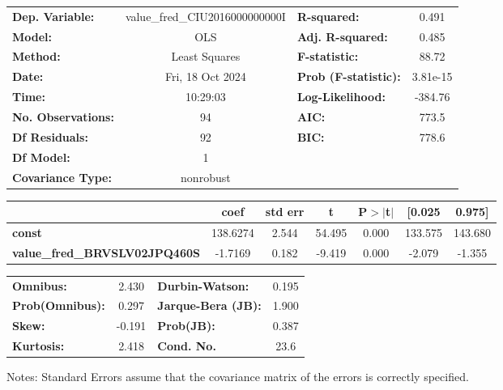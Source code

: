 \begin{center}
\begin{tabular}{lclc}
\toprule
\textbf{Dep. Variable:}               & value\_fred\_CIU2016000000000I & \textbf{  R-squared:         } &     0.491   \\
\textbf{Model:}                       &              OLS               & \textbf{  Adj. R-squared:    } &     0.485   \\
\textbf{Method:}                      &         Least Squares          & \textbf{  F-statistic:       } &     88.72   \\
\textbf{Date:}                        &        Fri, 18 Oct 2024        & \textbf{  Prob (F-statistic):} &  3.81e-15   \\
\textbf{Time:}                        &            10:29:03            & \textbf{  Log-Likelihood:    } &   -384.76   \\
\textbf{No. Observations:}            &                 94             & \textbf{  AIC:               } &     773.5   \\
\textbf{Df Residuals:}                &                 92             & \textbf{  BIC:               } &     778.6   \\
\textbf{Df Model:}                    &                  1             & \textbf{                     } &             \\
\textbf{Covariance Type:}             &           nonrobust            & \textbf{                     } &             \\
\bottomrule
\end{tabular}
\begin{tabular}{lcccccc}
                                      & \textbf{coef} & \textbf{std err} & \textbf{t} & \textbf{P$> |$t$|$} & \textbf{[0.025} & \textbf{0.975]}  \\
\midrule
\textbf{const}                        &     138.6274  &        2.544     &    54.495  &         0.000        &      133.575    &      143.680     \\
\textbf{value\_fred\_BRVSLV02JPQ460S} &      -1.7169  &        0.182     &    -9.419  &         0.000        &       -2.079    &       -1.355     \\
\bottomrule
\end{tabular}
\begin{tabular}{lclc}
\textbf{Omnibus:}       &  2.430 & \textbf{  Durbin-Watson:     } &    0.195  \\
\textbf{Prob(Omnibus):} &  0.297 & \textbf{  Jarque-Bera (JB):  } &    1.900  \\
\textbf{Skew:}          & -0.191 & \textbf{  Prob(JB):          } &    0.387  \\
\textbf{Kurtosis:}      &  2.418 & \textbf{  Cond. No.          } &     23.6  \\
\bottomrule
\end{tabular}
\end{center}

Notes: \newline
 [1] Standard Errors assume that the covariance matrix of the errors is correctly specified.